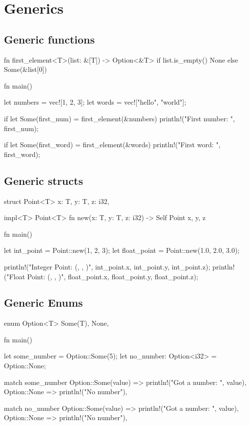 \documentclass[8pt,a4paper,twocolumn]{extarticle}
\begin{document}

\section{Generics}

\subsection{Generic functions}

\begin{Code}

  fn first_element<T>(list: &[T]) -> Option<&T> {
      if list.is_empty() {
          None
      } else {
          Some(&list[0])
      }
  }

  fn main() {
      let numbers = vec![1, 2, 3];
      let words = vec!["hello", "world"];
      
      if let Some(first_num) = first_element(&numbers) {
          println!("First number: {}", first_num);
      }
      
      if let Some(first_word) = first_element(&words) {
          println!("First word: {}", first_word);
      }
  }
\end{Code}

\subsection{Generic structs}

\begin{Code}
  struct Point<T> {
      x: T,
      y: T,
      z: i32,
  }

  impl<T> Point<T> {
      fn new(x: T, y: T, z: i32) -> Self {
          Point { x, y, z }
      }
  }

  fn main() {
      let int_point = Point::new(1, 2, 3);
      let float_point = Point::new(1.0, 2.0, 3.0);
      
      println!("Integer Point: ({}, {}, {})", int_point.x, int_point.y, int_point.z);
      println!("Float Point: ({}, {}, {})", float_point.x, float_point.y, float_point.z);
  }
\end{Code}

\subsection{Generic Enums}

\begin{Code}
  enum Option<T> {
      Some(T),
      None,
  }

  fn main() {
      let some_number = Option::Some(5);
      let no_number: Option<i32> = Option::None;
      
      match some_number {
          Option::Some(value) => println!("Got a number: {}", value),
          Option::None => println!("No number"),
      }
      
      match no_number {
          Option::Some(value) => println!("Got a number: {}", value),
          Option::None => println!("No number"),
      }
  }
\end{Code}
\end{document}
